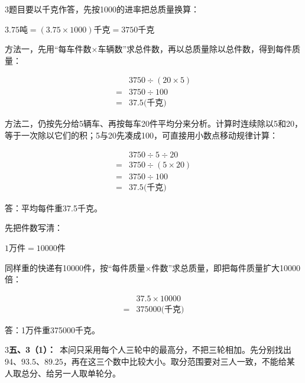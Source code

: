 \documentclass[multi=snippet,border={5bp 20bp 5bp 5bp}]{standalone}
\newenvironment{snippet}[3]{\begin{minipage}{#1bp}\color{answerred}\fontsize{#2}{#3}\selectfont\raggedright}{\end{minipage}}
\begin{document}
\begin{snippet}{505}{11.5}{14}\begin{multicols}{3}\raggedcolumns 题目要以千克作答，先按1000的进率把总质量换算：\par\noindent\(\displaystyle 3.75\text{吨}=(3.75\times1000)\text{千克}=3750\text{千克}\)\allowbreak \par 方法一，先用“每车件数×车辆数”求总件数，再以总质量除以总件数，得到每件质量：\par\noindent\[\displaystyle \begin{aligned}&3750\div(20\times5)\\={}&3750\div100\\={}&37.5\text{(千克)}\end{aligned}\]\par 方法二，仍按先分给5辆车、再按每车20件平均分来分析。计算时连续除以5和20，等于一次除以它们的积；5与20先凑成100，可直接用小数点移动规律计算：\par\noindent\[\displaystyle \begin{aligned}&3750\div5\div20\\={}&3750\div(5\times20)\\={}&3750\div100\\={}&37.5\text{(千克)}\end{aligned}\]\par 答：平均每件重37.5千克。\par 先把件数写清：\par\noindent\(\displaystyle 1\text{万件}=10000\text{件}\)\allowbreak \par 同样重的快递有10000件，按“每件质量×件数”求总质量，即把每件质量扩大10000倍：\par\noindent\[\displaystyle \begin{aligned}&37.5\times10000\\={}&375000\text{(千克)}\end{aligned}\]\par 答：1万件重375000千克。\end{multicols}\end{snippet}
\begin{snippet}{505}{11.5}{14}\begin{multicols}{3}\raggedcolumns \textbf{五、3（1）：}\ 本问只采用每个人三轮中的最高分，不把三轮相加。先分别找出94、\(93.5\)\allowbreak 、\(89.25\)\allowbreak ，再在这三个数中比较大小。取分范围要对三人一致，不能给某人取总分、给另一人取单轮分。\end{multicols}\end{snippet}
\end{document}
